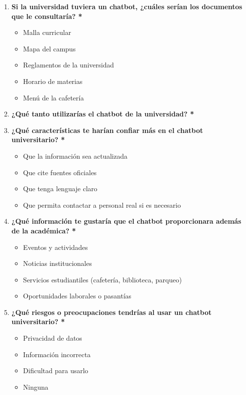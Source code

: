 {{\begin{enumerate}[label=\textbf{\arabic*.}]
            \item \textbf{Si la universidad tuviera un chatbot, ¿cuáles serían los documentos que le consultaría? *}
            \begin{itemize}[label=$\square$]
                \item Malla curricular
                \item Mapa del campus
                \item Reglamentos de la universidad
                \item Horario de materias
                \item Menú de la cafetería
            \end{itemize}

            \item \textbf{¿Qué tanto utilizarías el chatbot de la universidad? *}

            \item \textbf{¿Qué características te harían confiar más en el chatbot universitario? *}
            \begin{itemize}[label=$\square$]
                \item Que la información sea actualizada
                \item Que cite fuentes oficiales
                \item Que tenga lenguaje claro
                \item Que permita contactar a personal real si es necesario
            \end{itemize}

            \item \textbf{¿Qué información te gustaría que el chatbot proporcionara además de la académica? *}
            \begin{itemize}[label=$\square$]
                \item Eventos y actividades
                \item Noticias institucionales
                \item Servicios estudiantiles (cafetería, biblioteca, parqueo)
                \item Oportunidades laborales o pasantías
            \end{itemize}

            \item \textbf{¿Qué riesgos o preocupaciones tendrías al usar un chatbot universitario? *}
            \begin{itemize}[label=$\square$]
                \item Privacidad de datos
                \item Información incorrecta
                \item Dificultad para usarlo
                \item Ninguna
            \end{itemize}


\end{enumerate}}}
